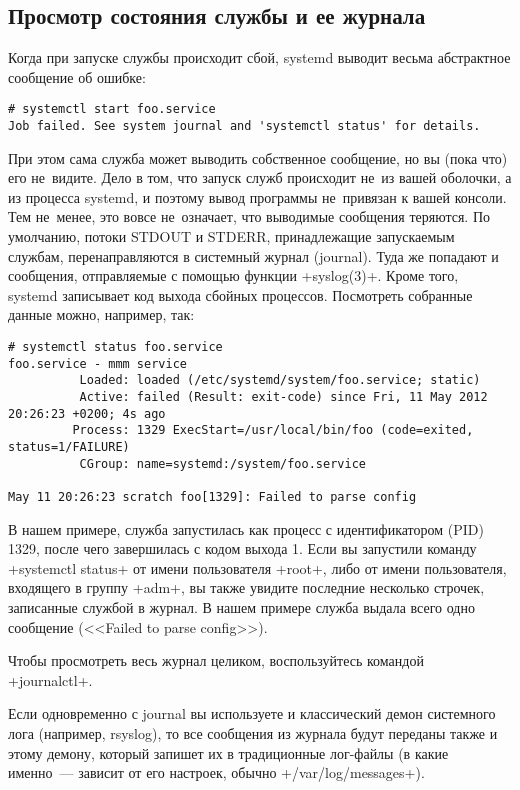 \documentclass[10pt,oneside,a4paper]{article}
\begin{document}
\subsection{Просмотр состояния службы и ее журнала}

Когда при запуске службы происходит сбой, systemd выводит весьма абстрактное
сообщение об ошибке:
\begin{Verbatim}
# systemctl start foo.service
Job failed. See system journal and 'systemctl status' for details.
\end{Verbatim}

При этом сама служба может выводить собственное сообщение, но вы (пока что) его
не~видите. Дело в том, что запуск служб происходит не~из вашей оболочки, а из
процесса systemd, и поэтому вывод программы не~привязан к вашей консоли. Тем
не~менее, это вовсе не~означает, что выводимые сообщения теряются. По умолчанию,
потоки STDOUT и STDERR, принадлежащие запускаемым службам, перенаправляются в
системный журнал (journal). Туда же попадают и сообщения, отправляемые с помощью
функции +syslog(3)+. Кроме того, systemd записывает код выхода сбойных
процессов. Посмотреть собранные данные можно, например, так:
\begin{Verbatim}
# systemctl status foo.service
foo.service - mmm service
          Loaded: loaded (/etc/systemd/system/foo.service; static)
          Active: failed (Result: exit-code) since Fri, 11 May 2012 20:26:23 +0200; 4s ago
         Process: 1329 ExecStart=/usr/local/bin/foo (code=exited, status=1/FAILURE)
          CGroup: name=systemd:/system/foo.service

May 11 20:26:23 scratch foo[1329]: Failed to parse config	
\end{Verbatim}

В нашем примере, служба запустилась как процесс с идентификатором (PID) 1329,
после чего завершилась с кодом выхода 1. Если вы запустили команду
+systemctl status+ от имени пользователя +root+, либо от имени пользователя,
входящего в группу +adm+, вы также увидите последние несколько строчек,
записанные службой в журнал. В нашем примере служба выдала всего одно сообщение
(<<Failed to parse config>>).

Чтобы просмотреть весь журнал целиком, воспользуйтесь командой +journalctl+.

Если одновременно с journal вы используете и классический демон системного лога
(например, rsyslog), то все сообщения из журнала будут переданы также и этому
демону, который запишет их в традиционные лог-файлы (в какие именно~--- зависит
от его настроек, обычно +/var/log/messages+).
\end{document}
